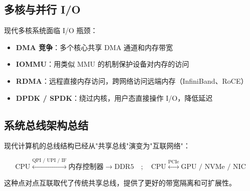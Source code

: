 \subsection{多核与并行 I/O}

现代多核系统面临 I/O 瓶颈：

\begin{itemize}
    \item \textbf{DMA 竞争}：多个核心共享 DMA 通道和内存带宽
    \item \textbf{IOMMU}：用类似 MMU 的机制保护设备对内存的访问
    \item \textbf{RDMA}：远程直接内存访问，跨网络访问远端内存（InfiniBand、RoCE）
    \item \textbf{DPDK / SPDK}：绕过内核，用户态直接操作 I/O，降低延迟
\end{itemize}

\subsection{系统总线架构总结}

现代计算机的总线结构已经从"共享总线"演变为"互联网络"：

\[
\text{CPU} \stackrel{\text{QPI / UPI / IF}}{\longleftrightarrow} \text{内存控制器} \to \text{DDR5} \quad ; \quad \text{CPU} \stackrel{\text{PCIe}}{\longleftrightarrow} \text{GPU / NVMe / NIC}
\]

这种点对点互联取代了传统共享总线，提供了更好的带宽隔离和可扩展性。

